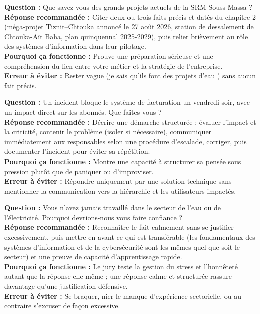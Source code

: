 \begin{tcolorbox}[colback=blue!4!white,colframe=blue!40!black,title=\textbf{Simulation 3 --- Entreprise SRM}]
\textbf{Question :} \og Que savez-vous des grands projets actuels de la SRM Souss-Massa ? \fg{}\\
\textbf{Réponse recommandée :} Citer deux ou trois faits précis et datés du chapitre 2 (méga-projet Tiznit--Chtouka annoncé le 27 août 2026, station de dessalement de Chtouka-Aït Baha, plan quinquennal 2025-2029), puis relier brièvement au rôle des systèmes d'information dans leur pilotage.\\
\textbf{Pourquoi ça fonctionne :} Prouve une préparation sérieuse et une compréhension du lien entre votre métier et la stratégie de l'entreprise.\\
\textbf{Erreur à éviter :} Rester vague (\og je sais qu'ils font des projets d'eau \fg{}) sans aucun fait précis.
\end{tcolorbox}

\begin{tcolorbox}[colback=blue!4!white,colframe=blue!40!black,title=\textbf{Simulation 4 --- Mise en Situation Professionnelle}]
\textbf{Question :} \og Un incident bloque le système de facturation un vendredi soir, avec un impact direct sur les abonnés. Que faites-vous ? \fg{}\\
\textbf{Réponse recommandée :} Décrire une démarche structurée : évaluer l'impact et la criticité, contenir le problème (isoler si nécessaire), communiquer immédiatement aux responsables selon une procédure d'escalade, corriger, puis documenter l'incident pour éviter sa répétition.\\
\textbf{Pourquoi ça fonctionne :} Montre une capacité à structurer sa pensée sous pression plutôt que de paniquer ou d'improviser.\\
\textbf{Erreur à éviter :} Répondre uniquement par une solution technique sans mentionner la communication vers la hiérarchie et les utilisateurs impactés.
\end{tcolorbox}

\begin{tcolorbox}[colback=blue!4!white,colframe=blue!40!black,title=\textbf{Simulation 5 --- Question Déstabilisante}]
\textbf{Question :} \og Vous n'avez jamais travaillé dans le secteur de l'eau ou de l'électricité. Pourquoi devrions-nous vous faire confiance ? \fg{}\\
\textbf{Réponse recommandée :} Reconnaître le fait calmement sans se justifier excessivement, puis mettre en avant ce qui est transférable (les fondamentaux des systèmes d'information et de la cybersécurité sont les mêmes quel que soit le secteur) et une preuve de capacité d'apprentissage rapide.\\
\textbf{Pourquoi ça fonctionne :} Le jury teste la gestion du stress et l'honnêteté autant que la réponse elle-même ; une réponse calme et structurée rassure davantage qu'une justification défensive.\\
\textbf{Erreur à éviter :} Se braquer, nier le manque d'expérience sectorielle, ou au contraire s'excuser de façon excessive.
\end{tcolorbox}

